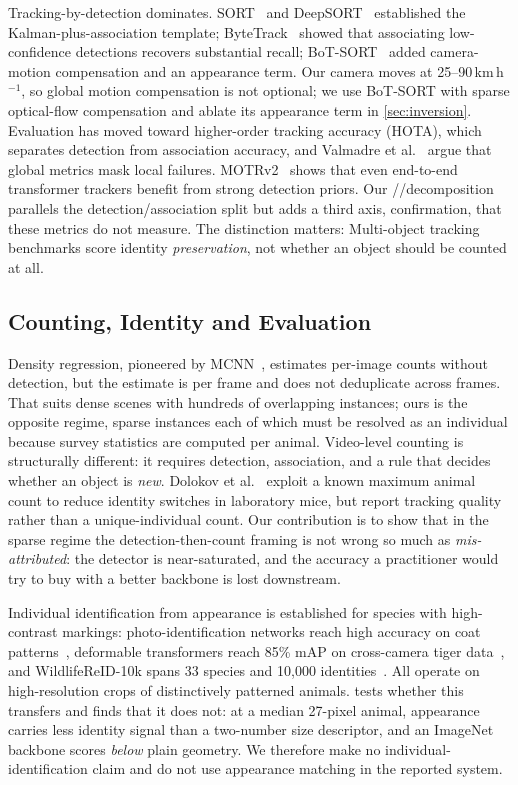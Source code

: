 Tracking-by-detection dominates. SORT~\cite{bewley2016sort} and
DeepSORT~\cite{wojke2017deepsort} established the Kalman-plus-association template;
ByteTrack~\cite{zhang2022bytetrack} showed that associating low-confidence detections recovers
substantial recall; BoT-SORT~\cite{aharon2022botsort} added camera-motion compensation and an
appearance term. Our camera moves at 25--90\,km\,h$^{-1}$, so global motion compensation is not
optional; we use BoT-SORT with sparse optical-flow compensation and ablate its appearance term
in \cref{sec:inversion}. Evaluation has moved toward higher-order tracking accuracy (HOTA), which separates detection from
association accuracy, and Valmadre et al.~\cite{valmadre2021local} argue that global metrics
mask local failures. MOTRv2~\cite{zhang2023motrv2} shows that even end-to-end transformer
trackers benefit from strong detection priors. Our \reachedq/\primaryq/\countedq decomposition
parallels the detection/association split but adds a third axis, confirmation, that these
metrics do not measure. The distinction matters: Multi-object tracking benchmarks score identity
\emph{preservation}, not whether an object should be counted at all.

\subsection{Counting, Identity and Evaluation}

\label{sec:rw:counting}

Density regression, pioneered by MCNN~\cite{zhang2016single}, estimates per-image counts
without detection, but the estimate is per frame and does not deduplicate across frames. That
suits dense scenes with hundreds of overlapping instances; ours is the opposite regime, sparse
instances each of which must be resolved as an individual because survey statistics are
computed per animal. Video-level counting is structurally different: it requires detection,
association, and a rule that decides whether an object is \emph{new}. Dolokov et
al.~\cite{dolokov2023upper} exploit a known maximum animal count to reduce identity switches in
laboratory mice, but report tracking quality rather than a unique-individual count. Our
contribution is to show that in the sparse regime the detection-then-count framing is not wrong
so much as \emph{mis-attributed}: the detector is near-saturated, and the accuracy a
practitioner would try to buy with a better backbone is lost downstream.

Individual identification from appearance is established for species with high-contrast
markings: photo-identification networks reach high accuracy on coat
patterns~\cite{miele2020revisiting}, deformable transformers reach 85\% mAP on cross-camera
tiger data~\cite{li2024redeformtr}, and WildlifeReID-10k spans 33 species and 10{,}000
identities~\cite{adam2025wildlifereid10k}. All operate on high-resolution crops of
distinctively patterned animals.  tests whether this transfers and finds that it
does not: at a median 27-pixel animal, appearance carries less identity signal than a
two-number size descriptor, and an ImageNet backbone scores \emph{below} plain geometry. We
therefore make no individual-identification claim and do not use appearance matching in the
reported system.

